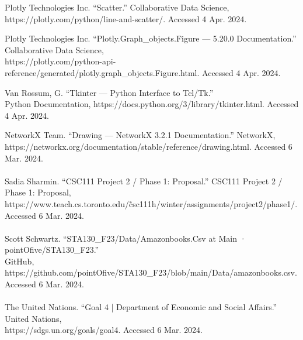 \documentclass{article}
\begin{document}
Plotly Technologies Inc. “Scatter.” Collaborative Data Science, \\
https://plotly.com/python/line-and-scatter/. Accessed 4 Apr. 2024.

Plotly Technologies Inc. “Plotly.Graph\_objects.Figure — 5.20.0 Documentation.” 
Collaborative Data Science, \\ https://plotly.com/python-api-
reference/generated/plotly.graph\_objects.Figure.html. Accessed 4 Apr. 2024.

Van Rossum, G. “Tkinter — Python Interface to Tcl/Tk.”  \\ Python Documentation, 
https://docs.python.org/3/library/tkinter.html. Accessed 4 Apr. 2024.


NetworkX Team. “Drawing — NetworkX 3.2.1 Documentation.” NetworkX, \\
https://networkx.org/documentation/stable/reference/drawing.html. Accessed 6 Mar. 
2024.\\
\\
Sadia Sharmin. “CSC111 Project 2 / Phase 1: Proposal.” CSC111 Project 2 / Phase 1: 
Proposal, \\ 
https://www.teach.cs.toronto.edu/\~csc111h/winter/assignments/project2/phase1/. \\
Accessed 6 Mar. 2024.
\\\\
Scott Schwartz. “STA130\_F23/Data/Amazonbooks.Csv at Main · pointOfive/STA130\_F23.” \\
GitHub, https://github.com/pointOfive/STA130\_F23/blob/main/Data/amazonbooks.csv. 
Accessed 6 Mar. 2024.
\\\\
The United Nations. “Goal 4 | Department of Economic and Social Affairs.” United 
Nations, \\
https://sdgs.un.org/goals/goal4. Accessed 6 Mar. 2024.
\end{document}
